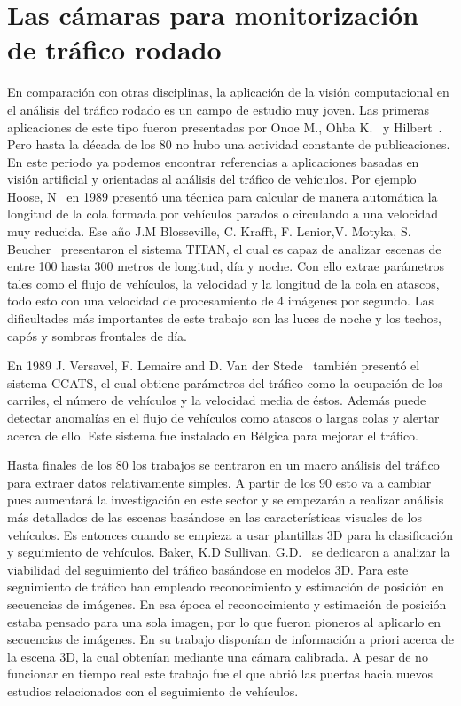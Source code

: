 \section{Las cámaras para monitorización de tráfico rodado}

En comparación con otras disciplinas, la aplicación de la visión computacional en el análisis del tráfico rodado es un campo de estudio muy joven. Las primeras aplicaciones de este tipo fueron presentadas por Onoe  M.,  Ohba  K.~\cite{digital_analisis} y Hilbert~\cite{wide_area}. Pero hasta la década de los 80 no hubo una actividad constante de publicaciones. En este periodo ya podemos encontrar referencias a aplicaciones basadas en visión artificial y orientadas al análisis del tráfico de vehículos. Por ejemplo Hoose, N~\cite{queue_detection} en 1989 presentó una técnica para calcular de manera automática la longitud de la cola formada por vehículos parados o circulando a una velocidad muy reducida. Ese año J.M Blosseville, C. Krafft, F. Lenior,V. Motyka, S. Beucher~\cite{traffic_measurement} presentaron el sistema TITAN, el cual es capaz de analizar escenas de entre 100 hasta 300 metros de longitud, día y noche. Con ello extrae parámetros tales como el flujo de vehículos, la velocidad y la longitud de la cola en atascos, todo esto con una velocidad de procesamiento de 4 imágenes por segundo. Las dificultades más importantes de este trabajo son las luces de noche y los techos, capós y sombras frontales de día. 

En 1989 J. Versavel, F. Lemaire and D. Van der Stede~\cite{computer_aided} también presentó el sistema CCATS, el cual obtiene parámetros del tráfico como la ocupación de los carriles, el número de vehículos y la velocidad media de éstos. Además puede detectar anomalías en el flujo de vehículos como atascos o largas colas y alertar acerca de ello. Este sistema fue instalado en Bélgica para mejorar el tráfico.

Hasta finales de los 80 los trabajos se centraron en un macro análisis del tráfico para extraer datos relativamente simples. A partir de los 90 esto va a cambiar pues aumentará la investigación en este sector y se empezarán a realizar análisis más detallados de las escenas basándose en las características visuales de los vehículos. Es entonces cuando se empieza a usar plantillas 3D para la clasificación y seguimiento de vehículos. Baker, K.D Sullivan, G.D.~\cite{performance_assessment} se dedicaron a analizar la viabilidad del seguimiento del tráfico basándose en modelos 3D. Para este seguimiento de tráfico han empleado reconocimiento y estimación de posición en secuencias de imágenes. En esa época el reconocimiento y estimación de posición estaba pensado para una sola imagen, por lo que fueron pioneros al aplicarlo en secuencias de imágenes. En su trabajo disponían de información a priori acerca de la escena 3D, la cual obtenían mediante una cámara calibrada. A pesar de no funcionar en tiempo real este trabajo fue el que abrió las puertas hacia nuevos estudios relacionados con el seguimiento de vehículos.

